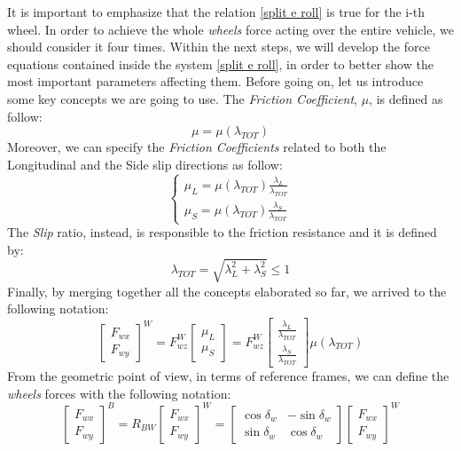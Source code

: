 It is important to emphasize that the relation \ref{split e roll} is true for the i-th wheel. In order to achieve the whole \textit{wheels} force acting over the entire vehicle, we should consider it four times. Within the next steps, we will develop the force equations contained inside the system \ref{split e roll}, in order to better show the most important parameters affecting them.
\newpage
Before going on, let us introduce some key concepts we are going to use. The \textit{Friction Coefficient}, $ \mu $, is defined as follow:
\begin{equation}
\mu = \mu(\lambda_{TOT})
\end{equation}
Moreover, we can specify the \textit{Friction Coefficients} related to both the Longitudinal and the Side slip directions as follow:
\begin{equation}
\begin{cases}
\mu_{L} = \mu(\lambda_{TOT}) \frac{\lambda_{L}}{\lambda_{TOT}}\\
\mu_{S} = \mu(\lambda_{TOT}) \frac{\lambda_{S}}{\lambda_{TOT}}
\end{cases}
\end{equation}
The \textit{Slip} ratio, instead, is responsible to the friction resistance and it is defined by:
\begin{equation}
\lambda_{TOT} = \sqrt{\lambda_{L}^{2} + \lambda_{S}^{2}} \leq 1
\end{equation}
Finally, by merging together all the concepts elaborated so far, we arrived to the following notation:	
\begin{equation} \label{Force 1st part}
\begin{bmatrix}
F_{wx} \\
F_{wy}
\end{bmatrix}^{W} = 
F_{wz}^{W}
\begin{bmatrix}
\mu_{L} \\
\mu_{S}
\end{bmatrix} = 
F_{wz}^{W}
\begin{bmatrix}
\frac{\lambda_{L}}{\lambda_{TOT}} \\
\frac{\lambda_{S}}{\lambda_{TOT}}
\end{bmatrix}
\mu(\lambda_{TOT})	
\end{equation}
From the geometric point of view, in terms of reference frames, we can define the \textit{wheels} forces with the following notation:
\begin{equation} \label{Force 2nd part}
\begin{bmatrix}
F_{wx} \\
F_{wy}
\end{bmatrix}^{B} =	
R_{BW}
\begin{bmatrix}
F_{wx} \\
F_{wy}
\end{bmatrix}^{W} =
\begin{bmatrix}
\cos\delta_{w} & -\sin\delta_{w} \\
\sin\delta_{w} & \cos\delta_{w}
\end{bmatrix}
\begin{bmatrix}
F_{wx} \\
F_{wy}
\end{bmatrix}^{W}
\end{equation}
